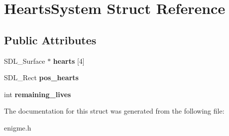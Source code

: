 \hypertarget{structHeartsSystem}{}\section{Hearts\+System Struct Reference}
\label{structHeartsSystem}
\subsection*{Public Attributes}
\begin{DoxyCompactItemize}
\item 
\mbox{\label{structHeartsSystem_a84d3465ddbc87e2f970728833b9fdfa5}} 
S\+D\+L\+\_\+\+Surface $\ast$ {\bfseries hearts} \mbox{[}4\mbox{]}
\item 
\mbox{\label{structHeartsSystem_abb895cab2a736128ddceebb422215bfd}} 
S\+D\+L\+\_\+\+Rect {\bfseries pos\+\_\+hearts}
\item 
\mbox{\label{structHeartsSystem_aef08860f571f9958c9979a5e7a0cd140}} 
int {\bfseries remaining\+\_\+lives}
\end{DoxyCompactItemize}


The documentation for this struct was generated from the following file\+:\begin{DoxyCompactItemize}
\item 
enigme.\+h\end{DoxyCompactItemize}
